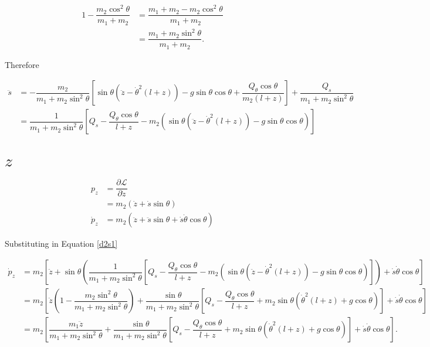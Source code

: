 \documentclass[12pt,a4paper,portrait]{article}
\newcommand{\lag}{\mathcal{L}}
\begin{document}
	\begin{align*}
		1-\dfrac{m_2\cos^2{\theta}}{m_1+m_2} &= \dfrac{m_1+m_2 - m_2\cos^2{\theta}}{m_1+m_2} \\
		&= \dfrac{m_1+m_2\sin^2{\theta}}{m_1+m_2}.
	\end{align*}
	
	Therefore
	
	\begin{align}
		\ddot{s} &= -\dfrac{m_2}{m_1+m_2\sin^2{\theta}}\left[\sin{\theta}(\ddot{z}-\dot{\theta}^2(l+z)) - g\sin{\theta}\cos{\theta} + \dfrac{Q_{\theta}\cos{\theta}}{m_2(l+z)}\right] + \dfrac{Q_s}{m_1+m_2\sin^2{\theta}} \nonumber\\
		&= \dfrac{1}{m_1+m_2\sin^2{\theta}}\left[Q_s - \dfrac{Q_{\theta}\cos{\theta}}{l+z} - m_2\left(\sin{\theta}(\ddot{z}-\dot{\theta}^2(l+z)) - g\sin{\theta}\cos{\theta}\right)\right] \label{d2s1}
	\end{align}
	
	\section{$z$}
	\begin{align*}
		p_z &= \dfrac{\partial \lag}{\partial \dot{z}} \\
		&= m_2(\dot{z} + \dot{s}\sin{\theta}) \\
		\dot{p}_z &= m_2 (\ddot{z} + \ddot{s}\sin{\theta} + \dot{s}\dot{\theta}\cos{\theta})
	\end{align*}
	
	Substituting in Equation \eqref{d2s1}
	
	\begin{align*}
		\dot{p}_z &= m_2 \left[\ddot{z} + \sin{\theta}\left(\dfrac{1}{m_1+m_2\sin^2{\theta}}\left[Q_s - \dfrac{Q_{\theta}\cos{\theta}}{l+z} - m_2\left(\sin{\theta}(\ddot{z}-\dot{\theta}^2(l+z)) - g\sin{\theta}\cos{\theta}\right)\right]\right) + \dot{s}\dot{\theta}\cos{\theta}\right]\\
		&= m_2 \left[\ddot{z}\left(1-\dfrac{m_2\sin^2{\theta}}{m_1+m_2\sin^2{\theta}}\right) + \dfrac{\sin{\theta}}{m_1+m_2\sin^2{\theta}}\left[Q_s - \dfrac{Q_{\theta}\cos{\theta}}{l+z} + m_2\sin{\theta}\left(\dot{\theta}^2(l+z) + g\cos{\theta}\right)\right] + \dot{s}\dot{\theta}\cos{\theta}\right] \\
		&=m_2 \left[\dfrac{m_1\ddot{z}}{m_1+m_2\sin^2{\theta}} + \dfrac{\sin{\theta}}{m_1+m_2\sin^2{\theta}}\left[Q_s - \dfrac{Q_{\theta}\cos{\theta}}{l+z} + m_2\sin{\theta}\left(\dot{\theta}^2(l+z) + g\cos{\theta}\right)\right] + \dot{s}\dot{\theta}\cos{\theta}\right].
	\end{align*}
	
\end{document}
